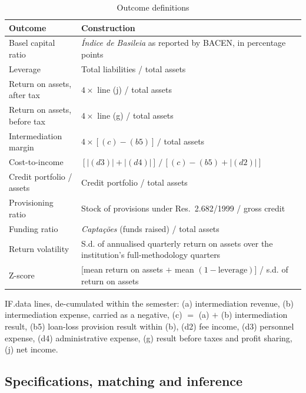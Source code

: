\documentclass[11pt,a4paper]{article}
\begin{document}
\begin{table}[htbp]
\centering
\small
\caption{Outcome definitions}
\label{tab:defs}
\begin{threeparttable}
\begin{tabular}{lp{10.2cm}}
\toprule
Outcome & Construction \\
\midrule
Basel capital ratio & \textit{Índice de Basileia} as reported by BACEN, in percentage
points \\
Leverage & Total liabilities / total assets \\
Return on assets, after tax & $4 \times$ line (j) / total assets \\
Return on assets, before tax & $4 \times$ line (g) / total assets \\
Intermediation margin & $4 \times [(c) - (b5)]\,/$ total assets \\
Cost-to-income & $[|(d3)| + |(d4)|] \,/\, [(c) - (b5) + |(d2)|]$ \\
Credit portfolio / assets & Credit portfolio / total assets \\
Provisioning ratio & Stock of provisions under Res.~2.682/1999 / gross credit \\
Funding ratio & \textit{Captações} (funds raised) / total assets \\
\midrule
Return volatility & S.d. of annualised quarterly return on assets over the institution's
full-methodology quarters \\
Z-score & [mean return on assets $+$ mean $(1 - \text{leverage})$] / s.d. of return on
assets \\
\bottomrule
\end{tabular}
\begin{tablenotes}[flushleft]\footnotesize
\item IF.data lines, de-cumulated within the semester: (a) intermediation revenue, (b) intermediation expense, carried as a negative, (c) $=$ (a) $+$ (b) intermediation result, (b5) loan-loss provision result within (b), (d2) fee
income, (d3) personnel expense, (d4) administrative expense, (g) result before taxes and profit sharing, (j) net income.
\end{tablenotes}
\end{threeparttable}
\end{table}

\subsection{Specifications, matching and inference}
\label{sec:inference}
\end{document}
